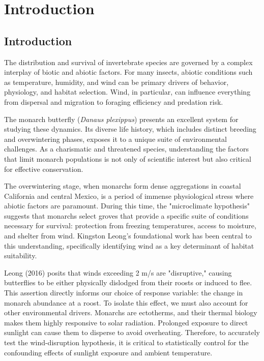 \chapter{Introduction}
\label{ch:introduction}

\section{Introduction}

The distribution and survival of invertebrate species are governed by a complex interplay of biotic and abiotic factors. For many insects, abiotic conditions such as temperature, humidity, and wind can be primary drivers of behavior, physiology, and habitat selection. Wind, in particular, can influence everything from dispersal and migration to foraging efficiency and predation risk.

The monarch butterfly (\textit{Danaus plexippus}) presents an excellent system for studying these dynamics. Its diverse life history, which includes distinct breeding and overwintering phases, exposes it to a unique suite of environmental challenges. As a charismatic and threatened species, understanding the factors that limit monarch populations is not only of scientific interest but also critical for effective conservation.

The overwintering stage, when monarchs form dense aggregations in coastal California and central Mexico, is a period of immense physiological stress where abiotic factors are paramount. During this time, the "microclimate hypothesis" suggests that monarchs select groves that provide a specific suite of conditions necessary for survival: protection from freezing temperatures, access to moisture, and shelter from wind. Kingston Leong's foundational work has been central to this understanding, specifically identifying wind as a key determinant of habitat suitability.

Leong (2016) posits that winds exceeding 2 m/s are "disruptive," causing butterflies to be either physically dislodged from their roosts or induced to flee. This assertion directly informs our choice of response variable: the change in monarch abundance at a roost. To isolate this effect, we must also account for other environmental drivers. Monarchs are ectotherms, and their thermal biology makes them highly responsive to solar radiation. Prolonged exposure to direct sunlight can cause them to disperse to avoid overheating. Therefore, to accurately test the wind-disruption hypothesis, it is critical to statistically control for the confounding effects of sunlight exposure and ambient temperature.

